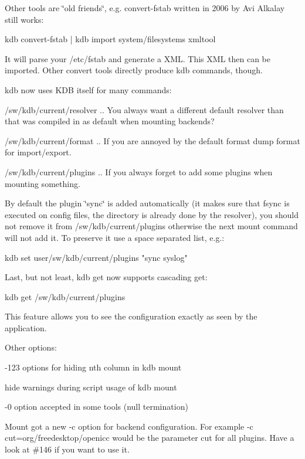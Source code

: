 Other tools are \char`\"{}old friends\char`\"{}, e.\+g. convert-\/fstab written in 2006 by Avi Alkalay still works\+: \begin{DoxyVerb}kdb convert-fstab | kdb import system/filesystems xmltool
\end{DoxyVerb}


It will parse your /etc/fstab and generate a X\+ML. This X\+ML then can be imported. Other convert tools directly produce kdb commands, though.

kdb now uses K\+DB itself for many commands\+:


\begin{DoxyItemize}
\item /sw/kdb/current/resolver .. You always want a different default resolver than that was compiled in as default when mounting backends?
\item /sw/kdb/current/format .. If you are annoyed by the default format dump format for import/export.
\item /sw/kdb/current/plugins .. If you always forget to add some plugins when mounting something.
\end{DoxyItemize}

By default the plugin \char`\"{}sync\char`\"{} is added automatically (it makes sure that fsync is executed on config files, the directory is already done by the resolver), you should not remove it from /sw/kdb/current/plugins otherwise the next mount command will not add it. To preserve it use a space separated list, e.\+g.\+: \begin{DoxyVerb}kdb set user/sw/kdb/current/plugins "sync syslog"
\end{DoxyVerb}


Last, but not least, kdb get now supports cascading get\+: \begin{DoxyVerb}kdb get /sw/kdb/current/plugins
\end{DoxyVerb}


This feature allows you to see the configuration exactly as seen by the application.

Other options\+:


\begin{DoxyItemize}
\item -\/123 options for hiding nth column in {\ttfamily kdb mount}
\item hide warnings during script usage of {\ttfamily kdb mount}
\item -\/0 option accepted in some tools (null termination)
\item Mount got a new -\/c option for backend configuration. For example -\/c cut=org/freedesktop/openicc would be the parameter cut for all plugins. Have a look at \#146 if you want to use it.
\end{DoxyItemize}

